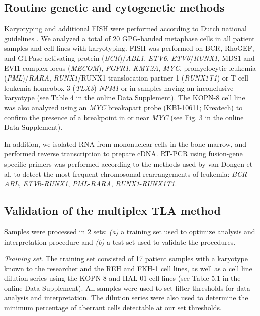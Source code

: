 \subsection{Routine genetic and cytogenetic methods}
Karyotyping and additional FISH were performed according to Dutch national guidelines \cite{Snijder_2015}. 
We analyzed a total of 20 GPG-banded metaphase cells in all patient samples and cell lines with karyotyping. 
FISH was performed on BCR, RhoGEF, and GTPase activating protein (\textsl{BCR})/\textsl{ABL1}, \textsl{ETV6}, \textsl{ETV6}/\textsl{RUNX1}, MDS1 and EVI1 complex locus (\textsl{MECOM}), \textsl{FGFR1}, \textsl{KMT2A}, \textsl{MYC}, promyelocytic leukemia (\textsl{PML})/\textsl{RARA}, \textsl{RUNX1}/RUNX1 translocation partner 1 (\textsl{RUNX1T1}) or T cell leukemia homeobox 3 (\textsl{TLX3})-\textsl{NPM1} or in samples having an inconclusive karyotype (see Table 4 in the online Data Supplement). 
The KOPN-8 cell line was also analyzed using an \textsl{MYC} breakapart probe (KBI-10611; Kreatech) to confirm the presence of a breakpoint in or near \textsl{MYC} (see Fig. 3 in the online Data Supplement). 

In addition, we isolated RNA from mononuclear cells in the bone marrow, and performed reverse transcription to prepare cDNA. RT-PCR using fusion-gene specific primers was performed according to the methods used by van Dongen et al.\cite{van_Dongen_1999} to detect the most frequent chromosomal rearrangements of leukemia: \textsl{BCR}-\textsl{ABL}, \textsl{ETV}6-\textsl{RUNX1}, \textsl{PML}-\textsl{RARA}, \textsl{RUNX1}-\textsl{RUNX1T1}.

\subsection{Validation of the multiplex TLA method}
Samples were processed in 2 sets: \textsl{(a)} a training set used to optimize analysis and interpretation procedure and \textsl{(b)} a test set used to validate the procedures. 

\textsl{Training set}. The training set consisted of 17 patient samples with a karyotype known to the researcher and the REH and FKH-1 cell lines, as well as a cell line dilution series using the KOPN-8 and HAL-01 cell lines (see Table 5.1 in the online Data Supplement). 
All samples were used to set filter thresholds for data analysis and interpretation. 
The dilution series were also used to determine the minimum percentage of aberrant cells detectable at our set thresholds.

